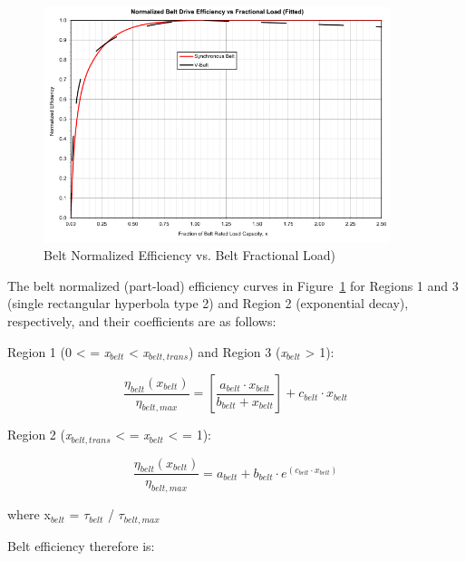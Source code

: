 {{{\begin{figure}[hbtp] %
\centering
\includegraphics[width=0.9\textwidth, height=0.9\textheight, keepaspectratio=true]{media/image4910.svg.png}
\caption{Belt Normalized Efficiency vs. Belt Fractional Load) \protect \label{fig:belt-normalized-efficiency-vs.-belt}}
\end{figure}

The belt normalized (part-load) efficiency curves in Figure~\ref{fig:belt-normalized-efficiency-vs.-belt} for Regions 1 and 3 (single rectangular hyperbola type 2) and Region 2 (exponential decay), respectively, and their coefficients are as follows:

Region 1 (0 \textless{} = \emph{x\(_{belt}\)} \textless{} \emph{x\(_{belt,trans}\)}) and Region 3 (\emph{x\(_{belt}\)} \textgreater{} 1):

\begin{equation}
\frac{{{\eta_{belt}}({x_{belt}})}}{{{\eta_{belt,max}}}} = \left[ {\frac{{{a_{belt}} \cdot {x_{belt}}}}{{{b_{belt}} + {x_{belt}}}}} \right] + {c_{belt}} \cdot {x_{belt}}
\label{eq:etabeltoveretabeltmaxRegion1}
\end{equation}

Region 2 (\emph{x\(_{belt,trans}\)} \textless{} = \emph{x\(_{belt}\)} \textless{} = 1):

\begin{equation}
\frac{{{\eta_{belt}}({x_{belt}})}}{{{\eta_{belt,max}}}} = {a_{belt}} + {b_{belt}} \cdot {e^{\left( {{c_{belt}} \cdot {x_{belt}}} \right)}}
\label{eq:etabeltoveretabeltmaxRegion2}
\end{equation}

where x\(_{belt}\) = \(\tau_{belt}\) / \(\tau_{belt,max}\)

Belt efficiency therefore is:

}}}
